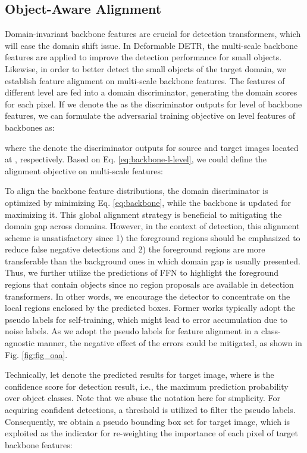 \documentclass[sigconf]{acmart}
\begin{document}
\subsection{Object-Aware Alignment}
Domain-invariant backbone features are crucial for detection transformers, which will ease the domain shift issue. In Deformable DETR, the multi-scale backbone features are applied to improve the detection performance for small objects. Likewise, in order to better detect the small objects of the target domain, we establish feature alignment on multi-scale backbone features. The features of different level  are fed into a domain discriminator, generating the domain scores for each pixel.
 If we denote the  as the discriminator outputs for  level of backbone features,  we can formulate the adversarial training objective on  level features of backbones as:

where the  denote the discriminator outputs for source and target images located at , respectively. Based on Eq. \eqref{eq:backbone-l-level}, we could define the alignment objective on multi-scale features:


To align the backbone feature distributions, the domain discriminator is optimized by minimizing Eq. \eqref{eq:backbone}, while the backbone is updated for maximizing it. This global alignment strategy is beneficial to mitigating the domain gap across domains. However, in the context of detection, this alignment scheme is unsatisfactory since 1) the foreground regions should be emphasized to reduce false negative detections and 2) the foreground regions are more transferable than the background ones in which domain gap is usually presented. Thus, we further utilize the predictions of FFN to highlight the foreground regions that contain objects since no region proposals are available in detection transformers. In other words, we encourage the detector to concentrate on the local regions enclosed by the predicted boxes. Former works typically adopt the pseudo labels for self-training, which might lead to error accumulation due to noise labels. As we adopt the pseudo labels for feature alignment in a class-agnostic manner, the negative effect of the errors could be mitigated, as shown in Fig. \ref{fig:fig_oaa}.

Technically, let  denote the predicted results for  target image, where  is the confidence score for  detection result, i.e., the maximum prediction probability over object classes. Note that we abuse the notation  here for simplicity. For acquiring confident detections, a threshold  is utilized to filter the pseudo labels. Consequently, we obtain a pseudo bounding box set  for  target image, which is exploited as the indicator for re-weighting the importance of each pixel of target backbone features:
\end{document}

